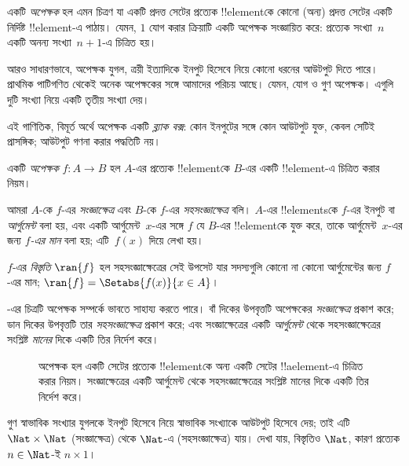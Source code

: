 \documentclass[../../../include/open-logic-section]{subfiles}
\begin{document}

\begin{explain}
একটি \emph{অপেক্ষক} হল এমন চিত্রণ যা একটি প্রদত্ত সেটের প্রত্যেক !!{element}কে কোনো (অন্য) প্রদত্ত সেটের একটি নির্দিষ্ট !!{element}-এ পাঠায়। যেমন, $1$ যোগ করার ক্রিয়াটি একটি অপেক্ষক সংজ্ঞায়িত করে: প্রত্যেক সংখ্যা~$n$ একটি অনন্য সংখ্যা~$n+1$-এ চিত্রিত হয়।

আরও সাধারণভাবে, অপেক্ষক যুগল, ত্রয়ী ইত্যাদিকে ইনপুট হিসেবে নিয়ে কোনো ধরনের আউটপুট দিতে পারে। প্রাথমিক পাটিগণিত থেকেই অনেক অপেক্ষকের সঙ্গে আমাদের পরিচয় আছে। যেমন, যোগ ও গুণ অপেক্ষক। এগুলি দুটি সংখ্যা নিয়ে একটি তৃতীয় সংখ্যা দেয়।

এই গাণিতিক, বিমূর্ত অর্থে অপেক্ষক একটি \emph{ব্ল্যাক বক্স}: কোন ইনপুটের সঙ্গে কোন আউটপুট যুক্ত, কেবল সেটিই প্রাসঙ্গিক; আউটপুট গণনা করার পদ্ধতিটি নয়।
\end{explain}

\begin{defn}[অপেক্ষক]
একটি \emph{অপেক্ষক} $f \colon A \to B$ হল $A$-এর প্রত্যেক !!{element}কে $B$-এর একটি !!{element}-এ চিত্রিত করার নিয়ম।

আমরা $A$-কে $f$-এর \emph{সংজ্ঞাক্ষেত্র} এবং $B$-কে $f$-এর \emph{সহসংজ্ঞাক্ষেত্র} বলি। $A$-এর !!{element}sকে $f$-এর ইনপুট বা \emph{আর্গুমেন্ট} বলা হয়, এবং একটি আর্গুমেন্ট~$x$-এর সঙ্গে $f$ যে $B$-এর !!{element}কে যুক্ত করে, তাকে আর্গুমেন্ট~$x$-এর জন্য \emph{$f$-এর মান} বলা হয়; এটি~$f(x)$ দিয়ে লেখা হয়।

$f$-এর \emph{বিস্তৃতি} $\ran{f}$ হল সহসংজ্ঞাক্ষেত্রের সেই উপসেট যার সদস্যগুলি কোনো না কোনো আর্গুমেন্টের জন্য $f$-এর মান; $\ran{f} = \Setabs{f(x)}{x \in A}$।
\end{defn}

-এর চিত্রটি অপেক্ষক সম্পর্কে ভাবতে সাহায্য করতে পারে। বাঁ দিকের উপবৃত্তটি অপেক্ষকের \emph{সংজ্ঞাক্ষেত্র} প্রকাশ করে; ডান দিকের উপবৃত্তটি তার \emph{সহসংজ্ঞাক্ষেত্র} প্রকাশ করে; এবং সংজ্ঞাক্ষেত্রের একটি \emph{আর্গুমেন্ট} থেকে সহসংজ্ঞাক্ষেত্রের সংশ্লিষ্ট \emph{মানের} দিকে একটি তির নির্দেশ করে।

\begin{figure}
  \caption{অপেক্ষক হল একটি সেটের প্রত্যেক !!{element}কে অন্য একটি সেটের !!a{element}-এ চিত্রিত করার নিয়ম। সংজ্ঞাক্ষেত্রের একটি আর্গুমেন্ট থেকে সহসংজ্ঞাক্ষেত্রের সংশ্লিষ্ট মানের দিকে একটি তির নির্দেশ করে।}
\end{figure}

\begin{ex}
গুণ স্বাভাবিক সংখ্যার যুগলকে ইনপুট হিসেবে নিয়ে স্বাভাবিক সংখ্যাকে আউটপুট হিসেবে দেয়; তাই এটি $\Nat \times \Nat$ (সংজ্ঞাক্ষেত্র) থেকে $\Nat$-এ (সহসংজ্ঞাক্ষেত্র) যায়। দেখা যায়, বিস্তৃতিও $\Nat$, কারণ প্রত্যেক $n \in \Nat$-ই $n \times 1$।
\end{ex}
\end{document}
